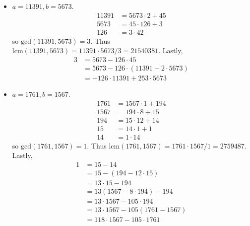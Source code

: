 \documentclass[12pt]{article}
\newenvironment{problem}[2][Exercise]{\begin{trivlist}
\item[\hskip \labelsep {\bfseries #1}\hskip \labelsep {\bfseries #2.}]}{\end{trivlist}}
\begin{document}
\begin{problem}{0.2.1}
\begin{itemize}
    \item $a=11391,b=5673$. 
    \begin{equation*}\begin{split}
    		11391 & = 5673 \cdot 2 + 45 \\
    		5673 & = 45 \cdot 126 + 3 \\
    		126 & = 3 \cdot 42
    \end{split}\end{equation*} so $\text{gcd}\left(11391,5673\right)=3$. Thus $\text{lcm}\left(11391,5673\right) = 11391\cdot 5673/3 = 21540381$. Lastly,
    \begin{equation*}\begin{split}
    	3 & = 5673 - 126 \cdot 45 \\
    	& = 5673 - 126\cdot \left(11391-2\cdot 5673\right) \\
    	& = -126 \cdot 11391 + 253\cdot 5673
    \end{split}\end{equation*} 
    
    \item $a=1761,b=1567$.
    	\begin{equation*}\begin{split}
    		1761 & = 1567 \cdot 1 + 194 \\
    		1567 & = 194 \cdot 8 + 15 \\
    		194 & = 15 \cdot 12 + 14 \\
    		15 & = 14 \cdot 1 + 1 \\
    		14 & = 1 \cdot 14
    	\end{split}\end{equation*} so $\text{gcd}\left(1761,1567\right)=1$. Thus $\text{lcm}\left(1761,1567\right) = 1761\cdot 1567 / 1 = 2759487$. Lastly,
    	\begin{equation*}\begin{split}
    		1 & = 15 - 14 \\
    		& = 15 - \left(194 - 12\cdot 15\right) \\
    		& = 13 \cdot 15 - 194 \\
    		& = 13 \left(1567 - 8\cdot 194\right) - 194 \\
    		& = 13\cdot 1567 - 105 \cdot 194 \\
    		& = 13 \cdot 1567 - 105 \left( 1761 - 1567\right) \\
    		& = 118\cdot 1567 - 105 \cdot 1761
    	\end{split}\end{equation*}
    

\end{itemize}
\end{problem}
\end{document}
